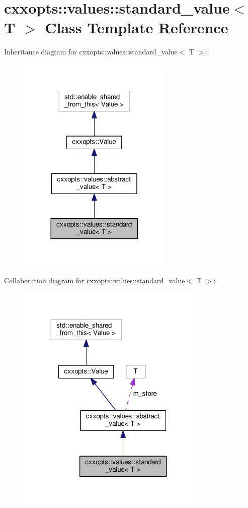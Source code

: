 \hypertarget{classcxxopts_1_1values_1_1standard__value}{}\section{cxxopts\+:\+:values\+:\+:standard\+\_\+value$<$ T $>$ Class Template Reference}
\label{classcxxopts_1_1values_1_1standard__value}


Inheritance diagram for cxxopts\+:\+:values\+:\+:standard\+\_\+value$<$ T $>$\+:
\nopagebreak
\begin{figure}[H]
\begin{center}
\leavevmode
\includegraphics[width=209pt]{classcxxopts_1_1values_1_1standard__value__inherit__graph}
\end{center}
\end{figure}


Collaboration diagram for cxxopts\+:\+:values\+:\+:standard\+\_\+value$<$ T $>$\+:
\nopagebreak
\begin{figure}[H]
\begin{center}
\leavevmode
\includegraphics[width=252pt]{classcxxopts_1_1values_1_1standard__value__coll__graph}
\end{center}
\end{figure}
